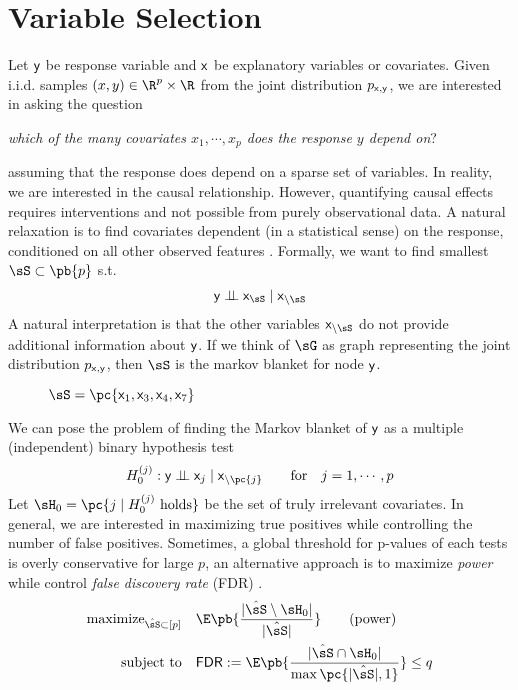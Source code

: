 \documentclass[11pt]{article}
\begin{document}
\section{Variable Selection}
 
Let $\mathsf{y}$ be response variable and $\mathsf{x}$ be explanatory variables or covariates. Given i.i.d. samples $(x,y)\in\R^p\times\R$ from the joint distribution $p_{\mathsf{x},\mathsf{y}}$, we are interested in asking the question 
\begin{center}
    \textit{which of the many covariates $x_1,\cdots,x_p$ does the response $y$ depend on}?
\end{center}
assuming that the response does depend on a sparse set of variables. In reality, we are interested in the causal relationship. However, quantifying causal effects requires interventions and not possible from purely observational data. A natural relaxation is to find covariates dependent (in a statistical sense) on the response, conditioned on all other observed features \cite{gimenezKnockoffsMassNew2019}. Formally, we want to find smallest $\sS\subset\pb{p}$ s.t.
\begin{align*}
    \ry \dperp \rx_{\sS} \mid \rx_{\setminus\sS}
\end{align*} 
A natural interpretation is that the other variables $\rx_{\setminus\sS}$ do not provide additional information about $\mathsf{y}$. If we think of $\sG$ as graph representing the joint distribution $p_{\mathsf{x},\mathsf{y}}$, then $\sS$ is the markov blanket for node $\mathsf{y}$. 
\begin{figure}[h!]
    \caption{$\sS =\pc{\rx_1,\rx_3,\rx_4,\rx_7}$}
\end{figure}
We can pose the problem of finding the Markov blanket of $\mathsf{y}$ as a multiple (independent) binary hypothesis test
\begin{align} 
    H_0^{(j)}:
        \ry \dperp \rx_j \mid \rx_{\setminus \pc{j}} 
    \quad\quad\text{for}\quad
        j = 1,\cdots,p
    \label{eq:test_markov_blanket}
\end{align}
Let $\sH_0 = \pc{j \mid H_0^{(j)} \text{ holds}}$ be the set of truly irrelevant covariates. In general, we are interested in maximizing true positives while controlling the number of false positives. Sometimes, a global threshold for p-values of each tests is overly conservative for large $p$, an alternative approach is to maximize \textit{power} while control \textit{false discovery rate} (\textsf{FDR}) \cite{benjaminiControllingFalseDiscovery1995}.
\begin{align}
    \text{maximize}_{\hat{\sS}\subset [p]}\quad
        &\E\pb{\frac{ |\hat{\sS} \setminus \sH_0| }{ |\hat{\sS}| }} \nonumber 
            \tag{power} \\
    \text{subject to}\quad
        &\textsf{FDR} := \E\pb{ \frac{ |\hat{\sS} \cap \sH_0| }{ \max\pc{|\hat{\sS}|,1} } } \leq q
    \label{eq:opt_fdr_control}
\end{align}
\end{document}
